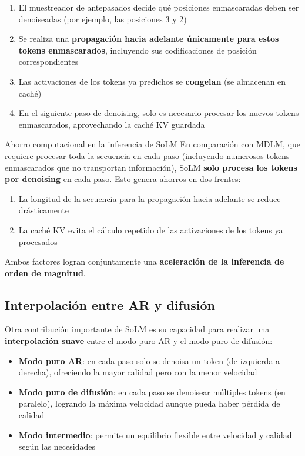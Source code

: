 \begin{enumerate}
    \item El muestreador de antepasados decide qué posiciones enmascaradas deben ser denoiseadas (por ejemplo, las posiciones 3 y 2)
    \item Se realiza una \textbf{propagación hacia adelante únicamente para estos tokens enmascarados}, incluyendo sus codificaciones de posición correspondientes
    \item Las activaciones de los tokens ya predichos se \textbf{congelan} (se almacenan en caché)
    \item En el siguiente paso de denoising, solo es necesario procesar los nuevos tokens enmascarados, aprovechando la caché KV guardada
\end{enumerate}

\begin{importantbox}{Ahorro computacional en la inferencia de SoLM}
En comparación con MDLM, que requiere procesar toda la secuencia en cada paso (incluyendo numerosos tokens enmascarados que no transportan información), SoLM \textbf{solo procesa los tokens por denoising} en cada paso. Esto genera ahorros en dos frentes:
\begin{enumerate}
    \item La longitud de la secuencia para la propagación hacia adelante se reduce drásticamente
    \item La caché KV evita el cálculo repetido de las activaciones de los tokens ya procesados
\end{enumerate}
Ambos factores logran conjuntamente una \textbf{aceleración de la inferencia de orden de magnitud}.
\end{importantbox}

\subsection{Interpolación entre AR y difusión}

Otra contribución importante de SoLM es su capacidad para realizar una \textbf{interpolación suave} entre el modo puro AR y el modo puro de difusión:

\begin{itemize}
    \item \textbf{Modo puro AR}: en cada paso solo se denoisa un token (de izquierda a derecha), ofreciendo la mayor calidad pero con la menor velocidad
    \item \textbf{Modo puro de difusión}: en cada paso se denoisear múltiples tokens (en paralelo), logrando la máxima velocidad aunque pueda haber pérdida de calidad
    \item \textbf{Modo intermedio}: permite un equilibrio flexible entre velocidad y calidad según las necesidades
\end{itemize}

